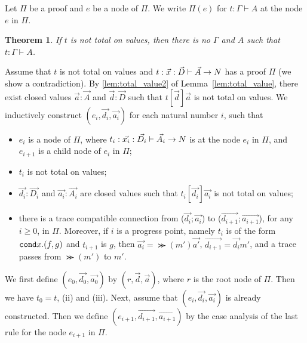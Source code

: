 \documentclass{article}
\newtheorem{theorem}{Theorem}[section]
\newenvironment{proof}[1][Proof]{\begin{trivlist}
\item[\hskip \labelsep {\bfseries #1}]}{\end{trivlist}}
\begin{document}
Let $\Pi$ be a proof and $e$ be a node of $\Pi$.
We write $\Pi(e)$ for $t:\Gamma\vdash A$ at the node $e$ in $\Pi$. 

\begin{theorem}
  If $t$ is not total on values, then there is no $\Gamma$ and $A$ such that $t: \Gamma\vdash A$. 
\end{theorem}
\begin{proof}
  Assume that $t$ is not total on values
  and $t: \vec{x}:\vec{D}\vdash\vec{A}\rightarrow{N}$ has a proof $\Pi$ (we show a contradiction).
  By \ref{lem:total_value2} of Lemma~\ref{lem:total_value},
  there exist closed values $\vec{a}:\vec{A}$ and $\vec{d}:\vec{D}$ such that
  $t[\vec{d}]\vec{a}$ is not total on values. 
  We inductively construct $(e_i,\vec{d_i},\vec{a_i})$ for each natural number $i$,
  such that
  \begin{itemize}
  \item[(i)]
    $e_i$ is a node of $\Pi$, where $t_i: \vec{x_i}:\vec{D_i}\vdash\vec{A_i}\rightarrow{N}$ is
    at the node $e_i$ in $\Pi$, and $e_{i+1}$ is a child node of $e_i$ in $\Pi$; 
  \item[(ii)]
    $t_i$ is not total on values;
  \item[(iii)]
    $\vec{d_i}:\vec{D_i}$ and $\vec{a_i}:\vec{A_i}$ are closed values
    such that $t_i[\vec{d_i}]\vec{a_i}$ is not total on values;
  \item[(iv)]
    there is a trace compatible connection from
    ($\vec{d_i};\vec{a_i}$) to ($\vec{d_{i+1}};\vec{a_{i+1}}$), for any $i\ge 0$, in $\Pi$.
    Moreover, if $i$ is a progress point, namely $t_i$ is of the form ${\tt cond} x.(f,g)$ and $t_{i+1}$ is $g$,
    then $\vec{a_i} = \Succ(m')\vec{a'}$, $\vec{d_{i+1}} = \vec{d_i}m'$, and
    a trace passes from $\Succ(m')$ to $m'$. 
  \end{itemize}
  
  We first define $(e_0,\vec{d_0},\vec{a_0})$ by $(r,\vec{d},\vec{a})$,
  where $r$ is the root node of $\Pi$. Then we have $t_0 = t$, (ii) and (iii). 
  Next, assume that $(e_i,\vec{d_i},\vec{a_i})$ is already constructed.
  Then we define $(e_{i+1},\vec{d_{i+1}},\vec{a_{i+1}})$ by the case analysis of
  the last rule for the node $e_{i+1}$ in $\Pi$. 


\end{proof}
\end{document}
